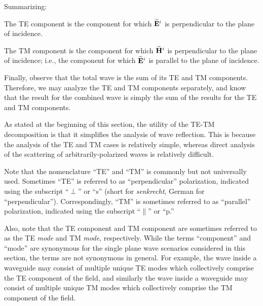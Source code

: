 Summarizing: 
\begin{mdframed}[backgroundcolor=yellow!20,nobreak=true] 
The TE component is the component for which $\widetilde{\bf E}^i$ is perpendicular to the plane of incidence.
\end{mdframed}
\begin{mdframed}[backgroundcolor=yellow!20,nobreak=true] 
The TM component is the component for which $\widetilde{\bf H}^i$ is perpendicular to the plane of incidence; i.e., the component for which $\widetilde{\bf E}^i$ is parallel to the plane of incidence.
\end{mdframed}
Finally, observe that the total wave is the sum of its TE and TM components.
Therefore, we may analyze the TE and TM components separately, and know that the result for the combined wave is simply the sum of the results for the TE and TM components. 

As stated at the beginning of this section, the utility of the TE-TM decomposition is that it simplifies the analysis of wave reflection.
This is because the analysis of the TE and TM cases is relatively simple, whereas direct analysis of the scattering of arbitrarily-polarized waves is relatively difficult.

Note that the nomenclature ``TE'' and ``TM'' is commonly but not universally used.  
Sometimes ``TE'' is referred to as ``perpendicular'' polarization, indicated using the subscript ``$\perp$'' or ``s'' (short for \emph{senkrecht}, German for ``perpendicular''). 
Correspondingly, ``TM'' is sometimes referred to as ``parallel'' polarization, indicated using the subscript ``$\parallel$'' or ``p.''

Also, note that the TE component and TM component are sometimes referred to as the TE \emph{mode} and TM \emph{mode}, respectively.  While the terms ``component'' and ``mode'' are synonymous for the single plane wave scenarios considered in this section, the terms are not synonymous in general.  For example, the wave inside a waveguide may consist of multiple unique TE modes which collectively comprise the TE component of the field, and similarly the wave inside a waveguide may consist of multiple unique TM modes which collectively comprise the TM component of the field.

